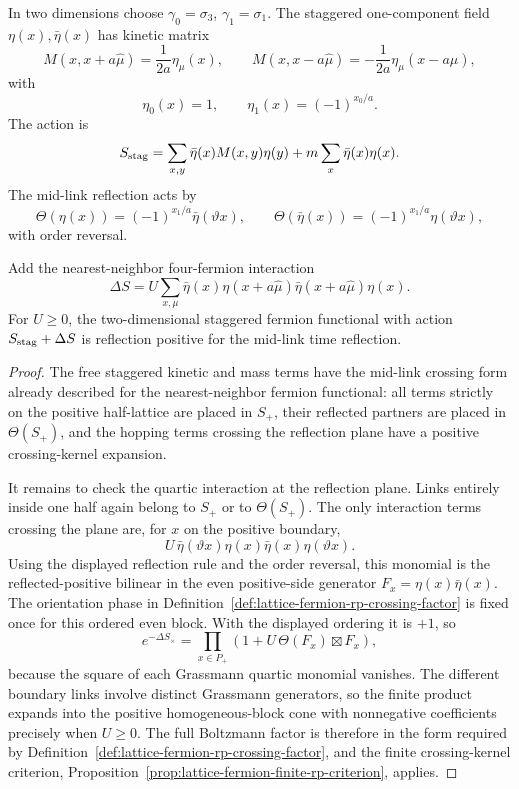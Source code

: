 In two dimensions choose \(\gamma_0=\sigma_3\), \(\gamma_1=\sigma_1\).
The staggered one-component field \(\eta(x),\bar\eta(x)\) has kinetic matrix
\[
  M(x,x+a\hat\mu)=\frac{1}{2a}\eta_\mu(x),
  \qquad
  M(x,x-a\hat\mu)=-\frac{1}{2a}\eta_\mu(x-a\hat\mu),
\]
with
\[
  \eta_0(x)=1,\qquad \eta_1(x)=(-1)^{x_0/a}.
\]
The action is
\[
  S_{\rm stag}
  =
  \sum_{x,y}\bar\eta(x)M(x,y)\eta(y)
  +
  m\sum_x\bar\eta(x)\eta(x).
\]
The mid-link reflection acts by
\[
  \Theta(\eta(x))=(-1)^{x_1/a}\bar\eta(\vartheta x),
  \qquad
  \Theta(\bar\eta(x))=(-1)^{x_1/a}\eta(\vartheta x),
\]
with order reversal.

\begin{proposition}
\label{prop:lattice-staggered-thirring-rp}
Add the nearest-neighbor four-fermion interaction
\[
  \Delta S
  =
  U\sum_{x,\mu}
  \bar\eta(x)\eta(x+a\hat\mu)\bar\eta(x+a\hat\mu)\eta(x).
\]
For \(U\geq0\), the two-dimensional staggered fermion functional with action
\(S_{\rm stag}+\Delta S\) is reflection positive for the mid-link time
reflection.
\end{proposition}

\begin{proof}
The free staggered kinetic and mass terms have the mid-link crossing form
already described for the nearest-neighbor fermion functional: all terms
strictly on the positive half-lattice are placed in \(S_+\), their reflected
partners are placed in \(\Theta(S_+)\), and the hopping terms crossing the
reflection plane have a positive crossing-kernel expansion.

It remains to check the quartic interaction at the reflection plane.  Links
entirely inside one half again belong to \(S_+\) or to \(\Theta(S_+)\).  The
only interaction terms crossing the plane are, for \(x\) on the positive
boundary,
\[
  U\,\bar\eta(\vartheta x)\eta(x)\bar\eta(x)\eta(\vartheta x).
\]
Using the displayed reflection rule and the order reversal, this monomial is
the reflected-positive bilinear in the even positive-side generator
\(F_x=\eta(x)\bar\eta(x)\).  The orientation phase in
Definition~\ref{def:lattice-fermion-rp-crossing-factor} is fixed once for this
ordered even block.  With the displayed ordering it is \(+1\), so
\[
  e^{-\Delta S_{\times}}
  =
  \prod_{x\in P_+}
  \left(
    1+U\,\Theta(F_x)\boxtimes F_x
  \right),
\]
because the square of each Grassmann quartic monomial vanishes.  The
different boundary links involve distinct Grassmann generators, so the finite
product expands into the positive homogeneous-block cone with nonnegative
coefficients precisely when \(U\geq0\).  The full Boltzmann factor is
therefore in the form required by
Definition~\ref{def:lattice-fermion-rp-crossing-factor}, and the finite
crossing-kernel criterion,
Proposition~\ref{prop:lattice-fermion-finite-rp-criterion}, applies.
\end{proof}

